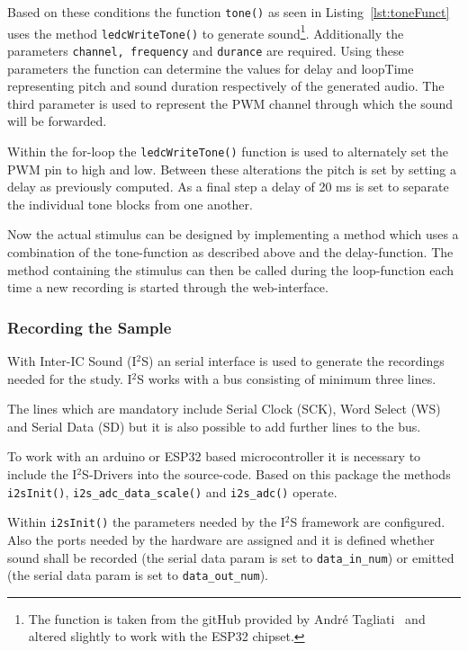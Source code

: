 Based on these conditions the function \texttt{tone()} as seen in Listing~\ref{lst:toneFunct} uses the method \texttt{ledcWriteTone()} to generate sound\footnote{The function is taken from the gitHub provided by André Tagliati~\cite{tagliati} and altered slightly to work with the ESP32 chipset.}.
Additionally the parameters \texttt{channel, frequency} and \texttt{durance} are required.
Using these parameters the function can determine the values for delay and loopTime representing pitch and sound duration respectively of the generated audio.
The third parameter is used to represent the PWM channel through which the sound will be forwarded.

Within the for-loop the \texttt{ledcWriteTone()} function is used to alternately set the PWM pin to high and low.
Between these alterations the pitch is set by setting a delay as previously computed.
As a final step a delay of 20 ms is set to separate the individual tone blocks from one another.

Now the actual stimulus can be designed by implementing a method which uses a combination of the tone-function as described above and the delay-function.
The method containing the stimulus can then be called during the loop-function each time a new recording is started through the web-interface.

\subsubsection{Recording the Sample}
With Inter-IC Sound (I$^2$S) an serial interface is used to generate the recordings needed for the study.
I$^2$S works with a bus consisting of minimum three lines.

The lines which are mandatory include Serial Clock (SCK), Word Select (WS) and Serial Data (SD) but it is also possible to add further lines to the bus.  

To work with an arduino or ESP32 based microcontroller it is necessary to include the I$^2$S-Drivers into the source-code.
Based on this package the methods\texttt{ i2sInit()}, \texttt{i2s\_adc\_data\_scale()} and \texttt{i2s\_adc()} operate.

Within \texttt{i2sInit()} the parameters needed by the I$^2$S framework are configured.
Also the ports needed by the hardware are assigned and it is defined whether sound shall be recorded (the serial data param is set to \texttt{data\_in\_num}) or emitted (the serial data param is set to \texttt{data\_out\_num}).

